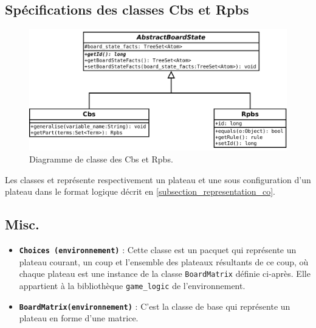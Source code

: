 \subsection{Spécifications des classes Cbs et Rpbs}
\label{subsection_cbs_rpbs}

\begin{figure}[H] 
\centering
    \includegraphics[width=\textwidth]{files/class_diagram/rpbs_cbs} 
\caption{Diagramme de classe des Cbs et Rpbs.} 
\label{img_diag_class_board_state}
\end{figure}

Les classes  et  représente respectivement un plateau et une sous configuration d'un plateau dans le format logique décrit en \vref{subsection_representation_co}. 

\subsection{Misc.}
\begin{itemize}
  \item \textbf {\texttt{\gls{Choices} (environnement)}} : Cette classe est un pacquet qui représente un plateau courant, un coup et l'ensemble des plateaux résultants de ce coup, où chaque plateau est une instance de la classe \texttt{\gls{BoardMatrix}} définie ci-après. Elle appartient à la bibliothèque \texttt{\gls{game_logic}} de l'environnement.
  \item \textbf {\texttt{\gls{BoardMatrix}(environnement)}} : C'est la classe de base qui représente un plateau en forme d'une matrice. 
  \end{itemize}
